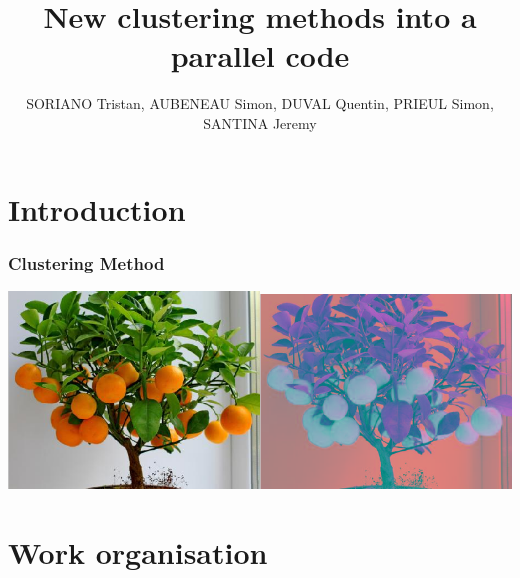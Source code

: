 \documentclass[10p]{beamer}
\date{}
\title{New clustering methods into a parallel code}
\author[SORIANO, AUBENEAU, DUVAL, PRIEUL, SANTINA]{SORIANO Tristan, AUBENEAU Simon, DUVAL Quentin, PRIEUL Simon, SANTINA Jeremy}
\institute{ENSEEIHT, 3IN}
\begin{document}
\begin{frame}
\maketitle
\end{frame}
\section{Introduction}
\begin{frame}
\frametitle{Clustering Method}
\includegraphics[width=0.5\textwidth]{Image/Oranger.png}\includegraphics[width=0.5\textwidth]{Image/OrangerClust.png}
\end{frame}
\section{Work organisation}
\end{document}
